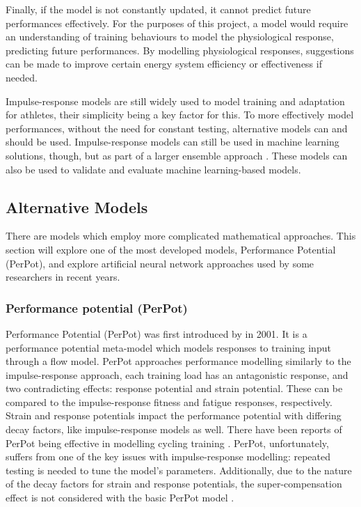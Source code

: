 Finally, if the model is not constantly updated, it cannot predict future performances effectively. For the purposes of this project, a model would require an understanding of training behaviours to model the physiological response, predicting future performances. By modelling physiological responses, suggestions can be made to improve certain energy system efficiency or effectiveness if needed. 

Impulse-response models are still widely used to model training and adaptation for athletes, their simplicity being a key factor for this. To more effectively model performances, without the need for constant testing, alternative models can and should be used. Impulse-response models can still be used in machine learning solutions, though, but as part of a larger ensemble approach \cite{Imbach2022}. These models can also be used to validate and evaluate machine learning-based models.

\subsection{Alternative Models}
There are models which employ more complicated mathematical approaches. This section will explore one of the most developed models, Performance Potential (PerPot), and explore artificial neural network approaches used by some researchers in recent years.

\subsubsection{Performance potential (PerPot)}
Performance Potential (PerPot) was first introduced by \textcite{perl2001} in 2001. It is a performance potential meta-model which models responses to training input through a flow model. PerPot approaches performance modelling similarly to the impulse-response approach, each training load has an antagonistic response, and two contradicting effects: response potential and strain potential. These can be compared to the impulse-response fitness and fatigue responses, respectively. Strain and response potentials impact the performance potential with differing decay factors, like impulse-response models as well. There have been reports of PerPot being effective in modelling cycling training \cite{Churchill2014}. PerPot, unfortunately, suffers from one of the key issues with impulse-response modelling: repeated testing is needed to tune the model's parameters. Additionally, due to the nature of the decay factors for strain and response potentials, the super-compensation effect is not considered with the basic PerPot model \cite{Churchill2014}. 

